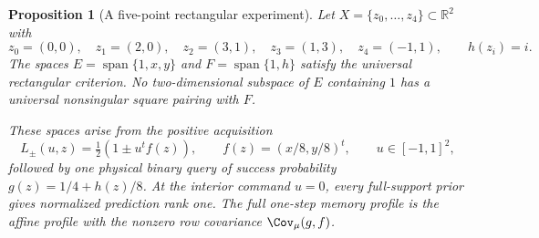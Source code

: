\documentclass[11pt]{amsart}
\newtheorem{proposition}[theorem]{Proposition}
\theoremstyle{definition}\newtheorem{definition}[theorem]{Definition}
\theoremstyle{remark}\newtheorem{remark}[theorem]{Remark}
\newcommand{\R}{\mathbb R}\newcommand{\N}{\mathbb N}\newcommand{\C}{\mathbb C}
\begin{document}
\begin{proposition}[A five-point rectangular experiment]
\label{prop:v19-pentagon}
Let $X=\{z_0,\ldots,z_4\}\subset\R^2$ with
\[
 z_0=(0,0),\quad z_1=(2,0),\quad z_2=(3,1),\quad
 z_3=(1,3),\quad z_4=(-1,1),\qquad h(z_i)=i.
\]
The spaces $E=\operatorname{span}\{1,x,y\}$ and
$F=\operatorname{span}\{1,h\}$ satisfy the universal rectangular
criterion. No two-dimensional subspace of $E$ containing $1$ has a
universal nonsingular square pairing with $F$.

These spaces arise from the positive acquisition
\[
 L_\pm(u,z)=\tfrac12(1\pm u^t f(z)),\qquad
 f(z)=(x/8,y/8)^t,\qquad u\in[-1,1]^2,
\]
followed by one physical binary query of success probability
$g(z)=1/4+h(z)/8$. At the interior command $u=0$, every full-support
prior gives normalized prediction rank one. The full one-step memory
profile is the affine profile with the nonzero row covariance
$\Cov_\mu(g,f)$.
\end{proposition}
\end{document}
